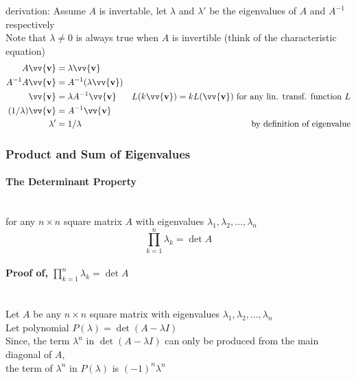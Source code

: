 \documentclass[11pt]{article}
\DeclareRobustCommand{\myvec}[1]{\vv{\mathbf{#1}}}
\newcommand{\mymat}[1]{#1}
\begin{document}
    derivation: Assume $\mymat{A}$ is invertable, let $\lambda$ and $\lambda'$ be the eigenvalues of $\mymat{A}$ and $\mymat{A}^{-1}$ respectively\\
    Note that $\lambda \ne 0$ is always true when $\mymat{A}$ is invertible (think of the characteristic equation)
    \begin{align*}
        \mymat{A}\myvec{v} &= \lambda\myvec{v} \\
        \mymat{A}^{-1} \mymat{A} \myvec{v} &= \mymat{A}^{-1} (\lambda \myvec{v}) \\
        \myvec{v} &= \lambda \mymat{A}^{-1} \myvec{v} & \mymat{L}(k\myvec{v}) = k\mymat{L}(\myvec{v}) \text{ for any lin. transf. function }\mymat{L}\\
        (1/\lambda)\myvec{v} &= \mymat{A}^{-1} \myvec{v}\\
        \lambda' &= 1/\lambda & \text{by definition of eigenvalue}
    \end{align*}
    \subsubsection{Product and Sum of Eigenvalues}
    \paragraph{The Determinant Property}~\\
    for any $n \times n$ square matrix $\mymat{A}$ with eigenvalues $\lambda_1, \lambda_2, \dots, \lambda_n$
    \begin{equation}
        \prod_{k=1}^{n} \lambda_k = \det \mymat{A}
    \end{equation}

    \paragraph{Proof of, $\prod_{k=1}^{n} \lambda_k = \det \mymat{A}$}~\vspace{1ex}\\
    Let $\mymat{A}$ be any $n \times n$ square matrix with eigenvalues $\lambda_1, \lambda_2, \dots, \lambda_n$ \\
    Let polynomial $P(\lambda) = \det(\mymat{A} - \lambda\mymat{I})$ \vspace{1ex}\\
    
    Since, the term $\lambda^n$ in $\det(\mymat{A} - \lambda\mymat{I})$ can only be produced from the main diagonal of $\mymat{A}$, \\
    the term of $\lambda^n$ in $P(\lambda)$ is $(-1)^n\lambda^n$ \vspace{1ex} \\
\end{document}
